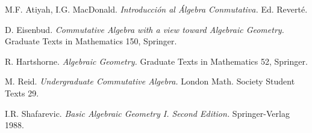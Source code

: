 \documentclass[ACGA.tex]{subfiles}
\begin{document}
%
%
%
%
%
%
%
%
%
%
%
%

\begin{thebibliography}{}
 
 M.F. Atiyah, I.G. MacDonald. \textit{Introducción al Álgebra Conmutativa.} Ed. Reverté.

 D. Eisenbud. \textit{Commutative Algebra with a view toward Algebraic Geometry.} Graduate Texts in Mathematics 150, Springer.

 R. Hartshorne. \textit{Algebraic Geometry.} Graduate Texts in Mathematics 52, Springer.

 M. Reid. \textit{Undergraduate Commutative Algebra.} London Math. Society Student Texts 29.

 I.R. Shafarevic. \textit{Basic Algebraic Geometry I. Second Edition.} Springer-Verlag 1988. 
\end{thebibliography}
\end{document}
